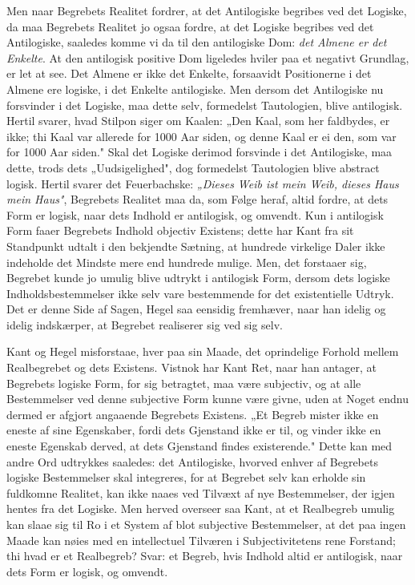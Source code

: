 \documentclass[12pt]{book}
\newcommand{\opage}[1]{\marginnote{\footnotesize\textit{[#1]}}}
\begin{document}
Men naar Begrebets Realitet fordrer, at det Antilogiske begribes ved det Logiske, da maa
Begrebets Realitet jo ogsaa fordre, at det Logiske begribes ved det Antilogiske, saaledes komme
vi da til den antilogiske Dom: \emph{det Almene er det Enkelte}. At den antilogisk positive Dom
ligeledes hviler paa et negativt Grundlag, er let at see. Det Almene er ikke det Enkelte,
forsaavidt Positionerne i det Almene ere logiske, i det Enkelte antilogiske. Men dersom det
Antilogiske nu forsvinder i det Logiske, maa dette selv, formedelst Tautologien, blive
antilogisk. Hertil svarer, hvad Stilpon siger om Kaalen: „Den Kaal, som her faldbydes, er ikke;
thi Kaal var allerede
\opage{162} for 1000 Aar siden, og denne Kaal er ei den, som var for 1000 Aar siden." Skal det Logiske
derimod forsvinde i det Antilogiske, maa dette, trods dets „Uudsigelighed", dog formedelst
Tautologien blive abstract logisk. Hertil svarer det Feuerbachske: \emph{„Dieses Weib ist mein
Weib, dieses Haus mein Haus"}, Begrebets Realitet maa da, som Følge heraf, altid fordre, at dets
Form er logisk, naar dets Indhold er antilogisk, og omvendt. Kun i antilogisk Form faaer
Begrebets Indhold objectiv Existens; dette har Kant fra sit Standpunkt udtalt i den bekjendte
Sætning, at hundrede virkelige Daler ikke indeholde det Mindste mere end hundrede mulige. Men,
det forstaaer sig, Begrebet kunde jo umulig blive udtrykt i antilogisk Form, dersom dets logiske
Indholdsbestemmelser ikke selv vare bestemmende for det existentielle Udtryk. Det er denne Side
af Sagen, Hegel saa eensidig fremhæver, naar han idelig og idelig indskærper, at Begrebet
realiserer sig ved sig selv.

Kant og Hegel misforstaae, hver paa sin Maade, det oprindelige Forhold mellem Realbegrebet og
dets Existens. Vistnok har Kant Ret, naar han antager, at Begrebets logiske Form, for sig
betragtet, maa være subjectiv, og at alle Bestemmelser ved denne subjective Form kunne være
givne, uden at Noget endnu dermed er afgjort angaaende Begrebets Existens. „Et Begreb mister
ikke en eneste af sine Egenskaber, fordi dets Gjenstand ikke er til, og vinder ikke en eneste
Egenskab derved, at dets Gjenstand findes existerende." Dette kan med andre Ord udtrykkes
saaledes: det Antilogiske, hvorved enhver af Begrebets logiske Bestemmelser skal integreres, for
at Begrebet selv kan erholde sin fuldkomne Realitet, kan ikke naaes ved Tilvæxt af nye
Bestemmelser, der igjen hentes fra det Logiske. Men herved overseer saa Kant, at et Realbegreb
umulig kan slaae sig til Ro i et System af blot subjective Bestemmelser, at det paa ingen Maade
kan nøies med en intellectuel Tilværen i Subjectivitetens rene Forstand; thi
\opage{163} hvad er et Realbegreb? Svar: et Begreb, hvis Indhold altid er antilogisk, naar dets Form er
logisk, og omvendt.
\end{document}
